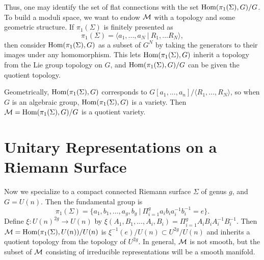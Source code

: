 	Thus, one may identify the set of flat connections with the set $\text{Hom}(\pi_1(\Sigma),G)/G$. To build a moduli space, we want to endow $\mathcal{M}$ with a topology and some geometric structure. If $\pi_1(\Sigma)$ is finitely presented as
	\begin{equation}
		\pi_1(\Sigma) = \langle a_1,...,a_N ~|~ R_1,...R_N \rangle,
	\end{equation}
	then consider $\text{Hom}(\pi_1(\Sigma),G)$ as a subset of $G^N$ by taking the generators to their images under any homomorphism. This lets $\text{Hom}(\pi_1(\Sigma),G)$ inherit a topology from the Lie group topology on $G$, and $\text{Hom}(\pi_1(\Sigma),G)/G$ can be given the quotient topology. 
	
	Geometrically, $\text{Hom}(\pi_1(\Sigma),G)$ corresponds to $G[a_1,...,a_n]/\langle R_1,...,R_N\rangle$, so when $G$ is an algebraic group, $\text{Hom}(\pi_1(\Sigma),G)$ is a variety. Then $\mathcal{M} = \text{Hom}(\pi_1(\Sigma),G)/ G$ is a quotient variety.
	
	
	
	\section{Unitary Representations on a Riemann Surface}
	\label{s:moduli-as-reps}
	Now we specialize to a compact connected Riemann surface $\Sigma$ of genus $g$, and $G=U(n)$. Then the fundamental group is 
	\begin{equation}
		\pi_1(\Sigma) = \{a_1, b_1,...,a_g, b_g ~|~ \Pi_{i=1}^g a_ib_ia_i^{-1}b_i^{-1} = e
		\}.
	\end{equation}
	Define $\xi:U(n)^{2g}\to U(n)$ by $\xi(A_1,B_1,...,A_i,B_i)=\Pi_{i=1}^g A_iB_iA_i^{-1}B_i^{-1}$. Then $\mathcal{M} = \text{Hom}(\pi_1(\Sigma),U(n))/U(n)$ is $\xi^{-1}(e)/U(n)\subset U^{2g}/U(n)$ and inherits a quotient topology from the topology of $U^{2g}$. In general, $\mathcal{M}$ is not smooth, but the subset of $\mathcal{M}$ consisting of irreducible representations will be a smooth manifold. 

